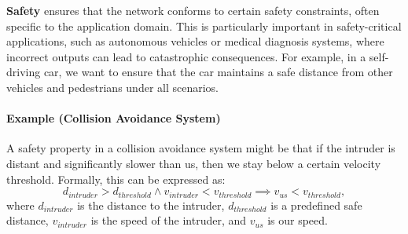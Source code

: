 \textbf{Safety} ensures that the network conforms to certain safety constraints, often specific to the application domain. This is particularly important in safety-critical applications, such as autonomous vehicles or medical diagnosis systems, where incorrect outputs can lead to catastrophic consequences. For example, in a self-driving car, we want to ensure that the car maintains a safe distance from other vehicles and pedestrians under all scenarios.

\paragraph{Example (Collision Avoidance System)} A safety property in a collision avoidance system might be that if the intruder is distant and significantly slower than us, then we stay below a certain velocity threshold. Formally, this can be expressed as:
\[
d_{intruder} > d_{threshold} \land v_{intruder} < v_{threshold} \implies v_{us} < v_{threshold},
\]
where $d_{intruder}$ is the distance to the intruder, $d_{threshold}$ is a predefined safe distance, $v_{intruder}$ is the speed of the intruder, and $v_{us}$ is our speed.






